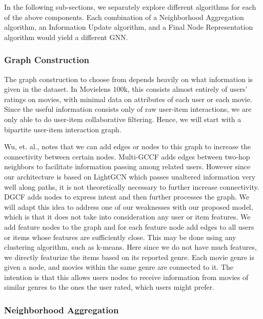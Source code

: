 \documentclass{article}
\begin{document}
In the following sub-sections, we separately explore different algorithms for each of the above components. Each combination of a Neighborhood Aggregation algorithm, an Information Update algorithm, and a Final Node Representation algorithm would yield a different GNN. 

\subsubsection{Graph Construction}

The graph construction to choose from depends heavily on what information is given in the dataset. In Movielens 100k, this consists almost entirely of users' ratings on movies, with minimal data on attributes of each user or each movie. Since the useful information consists only of raw user-item interactions, we are only able to do user-item collaborative filtering. Hence, we will start with a bipartite user-item interaction graph.

Wu, et. al., \cite{survey} notes that we can add edges or nodes to this graph to increase the connectivity between certain nodes. Multi-GCCF \cite{multigccf} adds edges between two-hop neighbors to facilitate information passing among related users. However since our architecture is based on LightGCN which passes unaltered information very well along paths, it is not theoretically necessary to further increase connectivity. DGCF \cite{dgcf} adds nodes to express intent and then further processes the graph. We will adapt this idea to address one of our weaknesses with our proposed model, which is that it does not take into consideration any user or item features. We add feature nodes to the graph and for each feature node add edges to all users or items whose features are sufficiently close. This may be done using any clustering algorithm, such as k-means. Here since we do not have much features, we directly featurize the items based on its reported genre. Each movie genre is given a node, and movies within the same genre are connected to it. The intention is that this allows users nodes to receive information from movies of similar genres to the ones the user rated, which users might prefer.

\subsubsection{Neighborhood Aggregation}
\label{neighborhood_aggregation}
\end{document}
